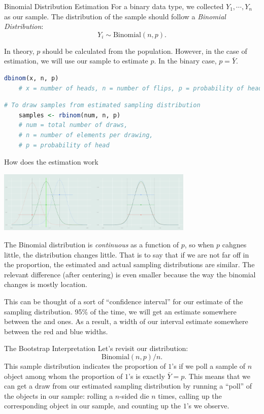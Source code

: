 \begin{thm}{Binomial Distribution Estimation}
	For a binary data type, we collected $Y_1,\cdots,Y_n$ as our sample. The distribution of the sample should follow a \textit{Binomial Distribution}: \[Y_i\sim\text{Binomial}(n,p).\]
\end{thm}
\begin{rmk}
	In theory, $p$ should be calculated from the population. However, in the case of estimation, we will use our sample to estimate $p$. In the binary case, $p=\bar{Y}$.
\end{rmk}
\begin{lstlisting}[title=Binomial Distribution, language=r]
	dbinom(x, n, p) 
	# x = number of heads, n = number of flips, p = probability of heads
\end{lstlisting}
\begin{lstlisting}[title=Binomial Sample, language=r]
	# To draw samples from estimated sampling distribution
	samples <- rbinom(num, n, p)
	# num = total number of draws, 
	# n = number of elements per drawing, 
	# p = probability of head
\end{lstlisting}
\begin{eg}{How does the estimation work}
	\begin{center}\includegraphics[width=0.7\textwidth]{figs/BinomialDistribution.png}\end{center}	
	The Binomial distribution is \textit{continuous} as a function of $p$, so when $p$ cahgnes little, the distribution changes little. That is to say that if we are not far off in the proportion, the estimated and actual sampling distributions are similar. The relevant difference (after centering) is even smaller because the way the binomial changes is mostly location. \par 
	This can be thought of a sort of ``confidence interval'' for our estimate of the sampling distribution. 95\% of the time, we will get an estimate somewhere between the {\color{red}{red}} and {\color{blue}{blue}} ones. As a result, a width of our interval estimate somewhere between the red and blue widths. 
\end{eg}
\begin{eg}{The Bootstrap Interpretation}
	Let's revisit our distribution: \[\text{Binomial}(n,p)/n.\]	This sample distribution indicates the proportion of $1$'s if we poll a sample of $n$ object among whom the proportion of $1$'s is exactly $\bar{Y}=p$. This means that we can get a draw from our estimated sampling distribution by running a ``poll'' of the objects in our sample: rolling a $n$-sided die $n$ times, calling up the corresponding object in our sample, and counting up the $1$'s we observe.  
\end{eg}
